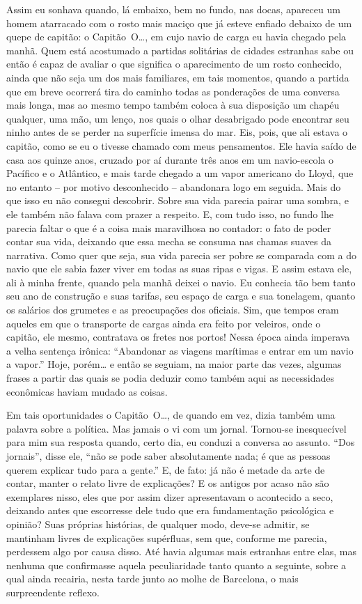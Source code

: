 Assim eu sonhava quando, lá embaixo, bem no fundo, nas docas, apareceu
um homem atarracado com o rosto mais maciço que já esteve enfiado
debaixo de um quepe de capitão: o Capitão~O\ldots{}, em cujo navio de carga
eu havia chegado pela manhã. Quem está acostumado a partidas solitárias
de cidades estranhas sabe ou então é capaz de avaliar o que significa o
aparecimento de um rosto conhecido, ainda que não seja um dos mais
familiares, em tais momentos, quando a partida que em breve ocorrerá
tira do caminho todas as ponderações de uma conversa mais longa, mas ao
mesmo tempo também coloca à sua disposição um chapéu qualquer, uma mão,
um lenço, nos quais o olhar desabrigado pode encontrar seu ninho antes
de se perder na superfície imensa do mar. Eis, pois, que ali estava o
capitão, como se eu o tivesse chamado com meus pensamentos. Ele havia
saído de casa aos quinze anos, cruzado por aí durante três anos em um
navio-escola o Pacífico e o Atlântico, e mais tarde chegado a um vapor
americano do Lloyd, que no entanto -- por motivo desconhecido
-- abandonara logo em seguida. Mais do que isso eu não
consegui descobrir. Sobre sua vida parecia pairar uma sombra, e ele
também não falava com prazer a respeito. E, com tudo isso, no fundo lhe
parecia faltar o que é a coisa mais maravilhosa no contador: o fato de
poder contar sua vida, deixando que essa mecha se consuma nas chamas
suaves da narrativa. Como quer que seja, sua vida parecia ser pobre se
comparada com a do navio que ele sabia fazer viver em todas as suas
ripas e vigas. E assim estava ele, ali à minha frente, quando pela manhã
deixei o navio. Eu conhecia tão bem tanto seu ano de construção e suas
tarifas, seu espaço de carga e sua tonelagem, quanto os salários dos
grumetes e as preocupações dos oficiais. Sim, que tempos eram aqueles em
que o transporte de cargas ainda era feito por veleiros, onde o capitão,
ele mesmo, contratava os fretes nos portos! Nessa época ainda imperava a
velha sentença irônica: ``Abandonar as viagens marítimas e entrar em um
navio a vapor.'' Hoje, porém\ldots{} e então se seguiam, na maior parte das
vezes, algumas frases a partir das quais se podia deduzir como também
aqui as necessidades econômicas haviam mudado as coisas.

Em tais oportunidades o Capitão~O\ldots{}, de quando em vez, dizia também uma
palavra sobre a política. Mas jamais o vi com um jornal. Tornou-se
inesquecível para mim sua resposta quando, certo dia, eu conduzi a
conversa ao assunto. ``Dos jornais'', disse ele, ``não se pode saber
absolutamente nada; é que as pessoas querem explicar tudo para a
gente.'' E, de fato: já não é metade da arte de contar, manter o relato
livre de explicações? E os antigos por acaso não são exemplares nisso,
eles que por assim dizer apresentavam o acontecido a seco, deixando
antes que escorresse dele tudo que era fundamentação psicológica e
opinião? Suas próprias histórias, de qualquer modo, deve-se admitir, se
mantinham livres de explicações supérfluas, sem que, conforme me
parecia, perdessem algo por causa disso. Até havia algumas mais
estranhas entre elas, mas nenhuma que confirmasse aquela peculiaridade
tanto quanto a seguinte, sobre a qual ainda recairia, nesta tarde junto
ao molhe de Barcelona, o mais surpreendente reflexo.


